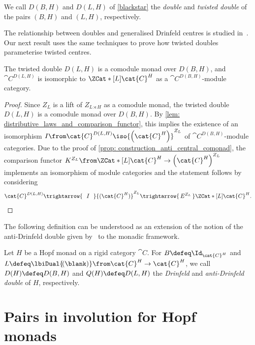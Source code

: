 \begin{definition}\label{def: double-and-twisted-double}
  We call \(D(B,H)\) and \(D(L,H)\) of \cref{blackstar} the \emph{double} and \emph{twisted double}
  of the pairs \((B,H)\) and \((L,H)\), respectively.
\end{definition}

The relationship between doubles and generalised Drinfeld centres
is studied in~\cite[Proposition~7.5 and Theorem~7.6]{Bruguieres2012}.
Our next result uses the same techniques to prove
how twisted doubles parameterise twisted centres.

\begin{theorem}\label{thm: twisted_doubles_vs_twisted_centres}
  The twisted double \(D(L, H)\) is a comodule monad over \(D(B,H)\),
  and \(\cat{C}^{D(L, H)}\) is isomorphic to \(\ZCat*[L]{\cat{C}^H}\) as a \(\cat{C}^{D(B, H)}\)\hyp{}module category.
\end{theorem}
\begin{proof}
  Since \(Z_L\) is a lift of \(Z_{L \rtimes H}\) as a comodule monad,
  the twisted double \(D(L, H)\) is a comodule monad over \(D(B,H)\).
  By \cref{lem: distributive_laws_and_comparison_functor},
  this implies the existence of an isomorphism
  \(I\from \cat{C}^{D(L, H)} \iso {\left(\cat{C}^H\right)}^{Z_L}\)
  of \(\cat{C}^{D(B, H)}\)\hyp{}module categories.
  Due to the proof of \cref{prop: construction_anti_central_comonad},
  the comparison functor \(K^{Z_L}\from  \ZCat*[L]{\cat{C}^H} \to {\left(\cat{C}^H\right)}^{Z_L}\)
  implements an isomorphism of module categories and the statement follows by considering
  \[
    \cat{C}^{D(L, H)} \trightarrow{\ \ I\ \ }
    {(\cat{C}^H)}^{Z_L} \trightarrow{\,E^{Z_L}\,}
    \ZCat*[L]{\cat{C}^H}.\qedhere
  \]
\end{proof}

The following definition can be understood as an extension of the notion of the anti\hyp{}Drinfeld double given by~\cite{Hajac2004a} to the monadic framework.

\begin{definition}\label{def: double_of_bimonad}
  Let \(H\) be a Hopf monad on a rigid category \(\cat{C}\).
  For \(B \defeq \Id_{\cat{C}^H}\) and \(L \defeq \lbiDual{\!(\blank)} \from \cat{C}^H \to \cat{C}^H\),
  we call \(D(H) \defeq D(B,H)\) and \(Q(H) \defeq D(L,H)\)
  the \emph{Drinfeld} and \emph{anti\hyp{}Drinfeld double} of \(H\), respectively.
\end{definition}

\section{Pairs in involution for Hopf monads}\label{subsec: monadic_perspective_piv_structures}

